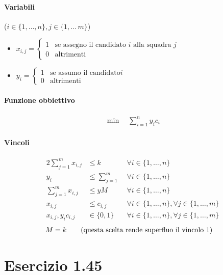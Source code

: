 \documentclass{article}
\begin{document}
\paragraph{Variabili} ($i \in \{1,\ldots,n\}, j \in \{1,\ldots\,m\}$)
\begin{itemize}
  \item $x_{i,j} = \begin{cases}
    1 &\text{se assegno il candidato }i\text{ alla squadra }j\\
    0 &\text{altrimenti}
  \end{cases}$
  \item $y_i = \begin{cases}
      1 &\text{se assumo il candidato}i\\
      0 &\text{altrimenti}
  \end{cases}$
\end{itemize}

\paragraph{Funzione obbiettivo}
\begin{align*}
  \min \quad \sum_{i=1}^n y_i c_i
\end{align*}

\paragraph{Vincoli}
\begin{alignat}{2}
  \sum_{j=1}^m x_{i,j} &\leq k &\forall i \in \{1,\ldots,n\} \\
  y_i &\leq \sum_{j=1}^m &\forall i \in \{1,\ldots,n\} \\
  \sum_{j=1}^m x_{i,j} &\leq yM &\forall i \in \{1,\ldots,n\} \\
  x_{i,j} &\leq c_{i,j} &\forall i \in \{1,\ldots,n\}, \forall j \in \{1,\ldots,m\} \\
  x_{i,j}, y_i c_{i,j} &\in \{0,1\} \quad &\forall i \in \{1,\ldots,n\}, \forall j \in \{1,\ldots,m\}
\end{alignat}
\begin{align}
  \setcounter{equation}{5}
  M &= k \qquad\text{(questa scelta rende superfluo il vincolo 1)}
\end{align}

\pagebreak
\section{Esercizio 1.45}
\end{document}
